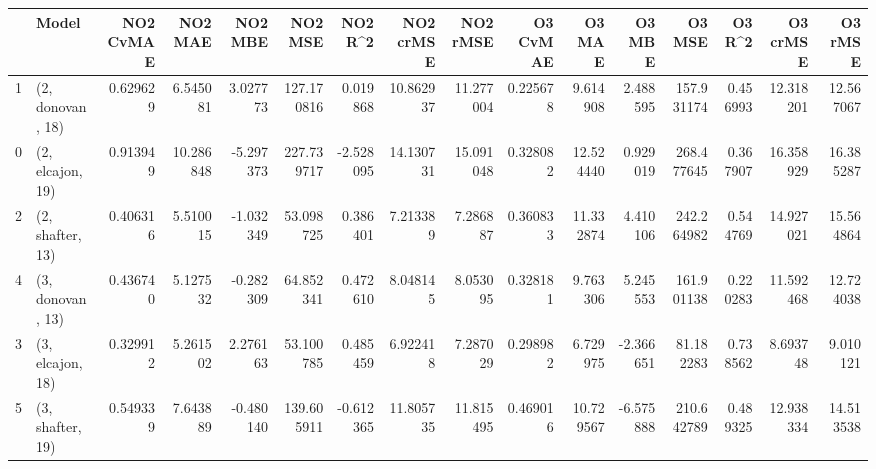 \begin{tabular}{llrrrrrrrrrrrrrr}
\toprule
{} &             Model &  NO2 CvMAE &    NO2 MAE &   NO2 MBE &     NO2 MSE &   NO2 R\textasciicircum2 &  NO2 crMSE &   NO2 rMSE &  O3 CvMAE &     O3 MAE &    O3 MBE &      O3 MSE &    O3 R\textasciicircum2 &   O3 crMSE &    O3 rMSE \\
\midrule
1 &  (2, donovan, 18) &   0.629629 &   6.545081 &  3.027773 &  127.170816 &  0.019868 &  10.862937 &  11.277004 &  0.225678 &   9.614908 &  2.488595 &  157.931174 &  0.456993 &  12.318201 &  12.567067 \\
0 &  (2, elcajon, 19) &   0.913949 &  10.286848 & -5.297373 &  227.739717 & -2.528095 &  14.130731 &  15.091048 &  0.328082 &  12.524440 &  0.929019 &  268.477645 &  0.367907 &  16.358929 &  16.385287 \\
2 &  (2, shafter, 13) &   0.406316 &   5.510015 & -1.032349 &   53.098725 &  0.386401 &   7.213389 &   7.286887 &  0.360833 &  11.332874 &  4.410106 &  242.264982 &  0.544769 &  14.927021 &  15.564864 \\
4 &  (3, donovan, 13) &   0.436740 &   5.127532 & -0.282309 &   64.852341 &  0.472610 &   8.048145 &   8.053095 &  0.328181 &   9.763306 &  5.245553 &  161.901138 &  0.220283 &  11.592468 &  12.724038 \\
3 &  (3, elcajon, 18) &   0.329912 &   5.261502 &  2.276163 &   53.100785 &  0.485459 &   6.922418 &   7.287029 &  0.298982 &   6.729975 & -2.366651 &   81.182283 &  0.738562 &   8.693748 &   9.010121 \\
5 &  (3, shafter, 19) &   0.549339 &   7.643889 & -0.480140 &  139.605911 & -0.612365 &  11.805735 &  11.815495 &  0.469016 &  10.729567 & -6.575888 &  210.642789 &  0.489325 &  12.938334 &  14.513538 \\
\bottomrule
\end{tabular}
